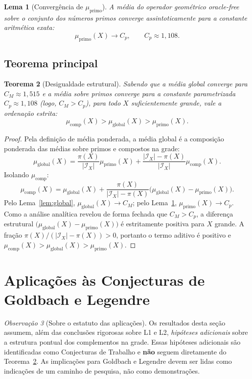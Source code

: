 \documentclass[12pt]{article}
\newtheorem{teorema}{Teorema}[section]
\newtheorem{lema}[teorema]{Lema}
\theoremstyle{definition}
\theoremstyle{remark}
\newtheorem{observacao}[teorema]{Observação}
\newcommand{\Ix}{\mathcal{I}_X}
\newcommand{\muglobal}{\mu_{\mathrm{global}}}
\newcommand{\muprimo}{\mu_{\mathrm{primo}}}
\newcommand{\mucomp}{\mu_{\mathrm{comp}}}
\begin{document}
	\begin{lema}[Convergência de $\muprimo$]\label{lem:muprimo}
		A média do operador geométrico oracle-free sobre o conjunto dos números primos converge assintoticamente para a constante aritmética exata:
		\[
		\muprimo(X)\to C_p,\qquad C_p \approx 1{,}108.
		\]
	\end{lema}
	
	\subsection{Teorema principal}
	
	\begin{teorema}[Desigualdade estrutural]\label{teo:probB}
		Sabendo que a média global converge para $C_M \approx 1{,}515$ e a média sobre primos converge para a constante parametrizada $C_p \approx 1{,}108$ (logo, $C_M > C_p$), para todo $X$ suficientemente grande, vale a ordenação estrita:
		\[
		\mucomp(X)>\muglobal(X)>\muprimo(X).
		\]
	\end{teorema}
	\begin{proof}
		Pela definição de média ponderada, a média global é a composição ponderada 
		das médias sobre primos e compostos na grade:
		\[
		\muglobal(X)
		=\frac{\pi(X)}{|\Ix|}\muprimo(X)
		+\frac{|\Ix|-\pi(X)}{|\Ix|}\mucomp(X).
		\]
		Isolando $\mucomp$:
		\[
		\mucomp(X)
		=\muglobal(X)+\frac{\pi(X)}{|\Ix|-\pi(X)}
		\bigl(\muglobal(X)-\muprimo(X)\bigr).
		\]
		Pelo Lema~\ref{lem:global}, $\muglobal(X)\to C_M$; pelo
		Lema~\ref{lem:muprimo}, $\muprimo(X)\to C_p$. Como a análise analítica revelou de forma fechada que
		$C_M > C_p$, a diferença estrutural $\bigl(\muglobal(X)-\muprimo(X)\bigr)$ 
		é estritamente positiva para $X$ grande.
		A fração $\pi(X)/(|\Ix|-\pi(X))>0$, portanto o termo aditivo é positivo e
		$\mucomp(X)>\muglobal(X)>\muprimo(X)$.
	\end{proof}
	
	\section{Aplicações às Conjecturas de Goldbach e Legendre}
	\label{sec:aplicacoes}
	
	\begin{observacao}[Sobre o estatuto das aplicações]
		Os resultados desta seção assumem, além das conclusões rigorosas sobre L1 e L2, \emph{hipóteses adicionais} sobre a estrutura pontual dos complementos na grade.
		Essas hipóteses adicionais são identificadas como Conjecturas de Trabalho e
		\textbf{não} seguem diretamente do Teorema~\ref{teo:probB}.
		As implicações para Goldbach e Legendre devem ser lidas como indicações
		de um caminho de pesquisa, não como demonstrações.
	\end{observacao}
	
\end{document}
